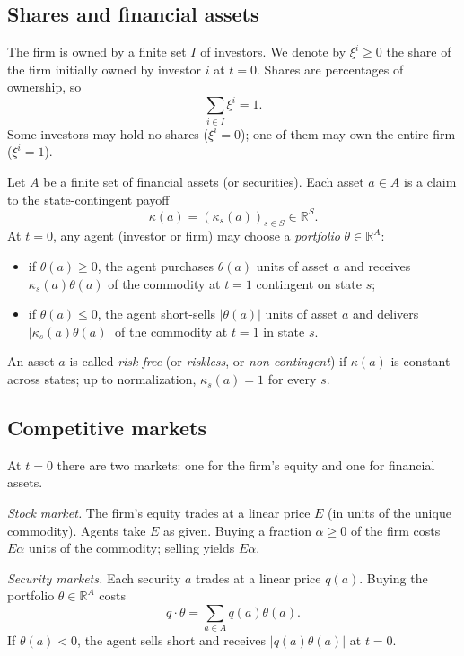 \documentclass[11pt,a4paper,oneside]{book}
\def\R{\mathbb{R}}
\def\leq{\leqslant}
\def\geq{\geqslant}
\theoremstyle{plain}
\theoremstyle{definition}
\theoremstyle{remark}
\numberwithin{equation}{chapter}
\begin{document}
\subsection{Shares and financial assets}

The firm is owned by a finite set $I$ of investors.
We denote by $\xi^i \geq 0$ the share of the firm initially owned by investor $i$ at $t=0$.
Shares are percentages of ownership, so
\begin{equation*}
  \sum_{i \in I} \xi^i = 1.
\end{equation*}
Some investors may hold no shares ($\xi^i = 0$); one of them may own the entire firm ($\xi^i = 1$).

Let $A$ be a finite set of financial assets (or securities).
Each asset $a \in A$ is a claim to the state-contingent payoff
\begin{equation*}
  \kappa(a) = (\kappa_s(a))_{s \in S} \in \R^S.
\end{equation*}
At $t=0$, any agent (investor or firm) may choose a \emph{portfolio} $\theta \in \R^A$:
\begin{itemize}
  \item if $\theta(a) \geq 0$, the agent purchases $\theta(a)$ units of asset $a$ and receives $\kappa_s(a) \theta(a)$ of the commodity at $t=1$ contingent on state $s$;
  \item if $\theta(a) \leq 0$, the agent short-sells $|\theta(a)|$ units of asset $a$ and delivers $|\kappa_s(a) \theta(a)|$ of the commodity at $t=1$ in state $s$.
\end{itemize}
An asset $a$ is called \emph{risk-free} (or \emph{riskless}, or \emph{non-contingent}) if $\kappa(a)$ is constant across states; up to normalization, $\kappa_s(a) = 1$ for every $s$.

\subsection{Competitive markets}

At $t=0$ there are two markets: one for the firm's equity and one for financial assets.

\emph{Stock market.}
The firm's equity trades at a linear price $E$ (in units of the unique commodity).
Agents take $E$ as given.
Buying a fraction $\alpha \geq 0$ of the firm costs $E \alpha$ units of the commodity; selling yields $E \alpha$.

\emph{Security markets.}
Each security $a$ trades at a linear price $q(a)$.
Buying the portfolio $\theta \in \R^A$ costs
\begin{equation*}
  q \cdot \theta = \sum_{a \in A} q(a) \theta(a).
\end{equation*}
If $\theta(a) < 0$, the agent sells short and receives $|q(a) \theta(a)|$ at $t=0$.
\end{document}
